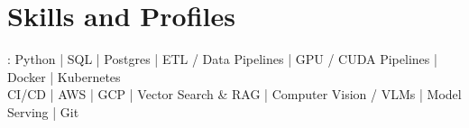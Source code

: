 \documentclass[print]{jack-resume}
\begin{document}
\pagecolor{darkmodeBackground}

%
%



%
%
\begin{minipage}[t][1cm][t]{.03\textwidth}
    \hfill
\end{minipage}






\section{Skills and Profiles}
:
Python \hfill | \hfill
SQL \hfill | \hfill
Postgres \hfill | \hfill
ETL / Data Pipelines \hfill | \hfill
GPU / CUDA Pipelines \hfill | \hfill
Docker \hfill | \hfill
Kubernetes \\
\hspace{1.0cm} CI/CD \hfill | \hfill
AWS \hfill | \hfill
GCP \hfill | \hfill
Vector Search \& RAG \hfill | \hfill
Computer Vision / VLMs \hfill | \hfill
Model Serving \hfill | \hfill
Git \\
\end{document}
